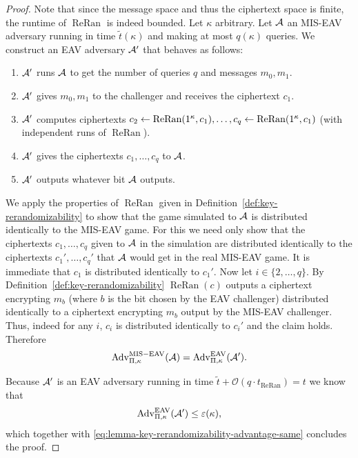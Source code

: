 \begin{proof}
	Note that since the message space and thus the ciphertext space is finite, the runtime of $\operatorname{ReRan}$ is indeed bounded. Let $\kappa$ arbitrary. Let $\mathcal{A}$ an MIS-EAV adversary running in time $\tilde{t}(\kappa)$ and making at most $q(\kappa)$ queries. We construct an EAV adversary $\mathcal{A}'$ that behaves as follows:
	\begin{enumerate}[1.]
		\item $\mathcal{A}'$ runs $\mathcal{A}$ to get the number of queries $q$ and messages $m_0, m_1$.
		\item $\mathcal{A}'$ gives $m_0, m_1$ to the challenger and receives the ciphertext $c_1$.
		\item $\mathcal{A}'$ computes ciphertexts $c_2 \leftarrow \operatorname{ReRan}(1^\kappa, c_1), \ldots, c_q \leftarrow \operatorname{ReRan}(1^\kappa, c_1)$ (with independent runs of $\operatorname{ReRan}$).
		\item $\mathcal{A}'$ gives the ciphertexts $c_1, \ldots, c_q$ to $\mathcal{A}$.
		\item $\mathcal{A}'$ outputs whatever bit $\mathcal{A}$ outputs.
	\end{enumerate}
	We apply the properties of $\operatorname{ReRan}$ given in Definition~\ref{def:key-rerandomizability} to show that the game simulated to $\mathcal{A}$ is distributed identically to the MIS-EAV game. For this we need only show that the ciphertexts $c_1, \ldots, c_q$ given to $\mathcal{A}$ in the simulation are distributed identically to the ciphertexts $c_1', \ldots, c_q'$ that $\mathcal{A}$ would get in the real MIS-EAV game. It is immediate that $c_1$ is distributed identically to $c_1'$. Now let $i \in \{2, \ldots, q\}$. By Definition~\ref{def:key-rerandomizability} $\operatorname{ReRan}(c)$ outputs a ciphertext encrypting $m_b$ (where $b$ is the bit chosen by the EAV challenger) distributed identically to a ciphertext encrypting $m_b$ output by the MIS-EAV challenger. Thus, indeed for any $i$, $c_i$ is distributed identically to $c_i'$ and the claim holds. Therefore
	\begin{equation} \label{eq:lemma-key-rerandomizability-advantage-same}
		\mathrm{Adv}_{\Pi, \kappa}^{\mathrm{MIS-EAV}}(\mathcal{A}) = \mathrm{Adv}_{\Pi, \kappa}^{\mathrm{EAV}}(\mathcal{A}').
	\end{equation}

	Because $\mathcal{A}'$ is an EAV adversary running in time $\tilde{t} + \mathcal{O}(q \cdot t_{\operatorname{ReRan}}) = t$ we know that
	\[
		\mathrm{Adv}_{\Pi, \kappa}^{\mathrm{EAV}}(\mathcal{A}') \le \varepsilon(\kappa),
	\]
	which together with \eqref{eq:lemma-key-rerandomizability-advantage-same} concludes the proof.
\end{proof}

